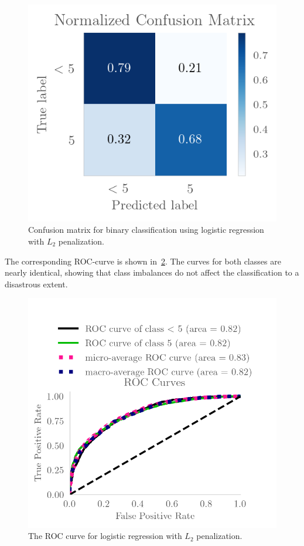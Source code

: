 \begin{figure}[H]
    \centering
    \includegraphics{Figures/logreg_l2_conf.png}
    \caption{Confusion matrix for binary classification using logistic 
    regression with $L_2$ penalization.}
    \label{fig:logreg_conf}
\end{figure}

The corresponding ROC-curve is shown in~\cref{fig:logreg_roc}. The curves for both classes are nearly identical, showing that class imbalances do not affect the
classification to a disastrous extent. 

\begin{figure}[H]
    \centering
    \includegraphics{Figures/logreg_l2_roc.png}
    \caption{The ROC curve for logistic regression with $L_2$ penalization.}
    \label{fig:logreg_roc}
\end{figure}

